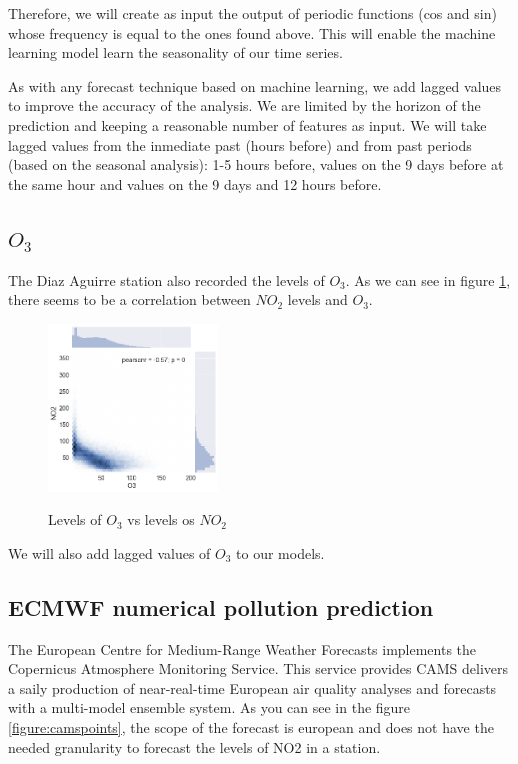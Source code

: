 \documentclass[a4paper,twocolumn,5p]{elsarticle}
\begin{document}
Therefore, we will create as input the output of periodic functions (cos and sin) whose frequency 
is equal to the ones found 
above. This will enable the machine learning model learn the seasonality of our time series.

As with any forecast technique based on machine learning, we add lagged values to improve the accuracy 
of the analysis. We are limited by the horizon of the prediction and 
keeping a reasonable number of features as input. We will take lagged values from the inmediate past (hours before)
and from past periods (based on the seasonal analysis): 1-5 hours before, values on the 9 days before at the same 
hour and values on the 9 days and 12 hours before.

\subsection{$O_3$}

The Diaz Aguirre station also recorded the levels of $O_3$. As we can see in figure \ref{figure:no2vso3},
there seems to be a correlation between $NO_2$ levels and $O_3$.

\begin{figure}
  \centering
  \includegraphics[width=0.4\textwidth]{no2vso3}
  \label{figure:no2vso3}
  \caption{Levels of $O_3$ vs levels os $NO_2$}
\end{figure}

We will also add lagged values of $O_3$ to our models.

\subsection{ECMWF numerical pollution prediction}
\label{sec:ecmwf-numer-poll}

The European Centre for Medium-Range Weather Forecasts implements the Copernicus Atmosphere Monitoring Service.
This service provides CAMS delivers a saily production of near-real-time European air quality analyses and forecasts 
with a multi-model ensemble system. 
As you can see in the figure \ref{figure:camspoints}, the scope of the forecast is european and does not have the needed granularity to forecast 
the levels of NO2 in a station.
\end{document}
